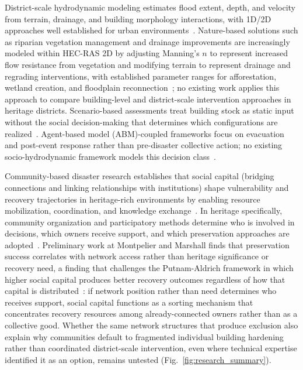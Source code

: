 \documentclass[11pt]{article}
\begin{document}
District-scale hydrodynamic modeling estimates flood extent, depth, and velocity
from terrain, drainage, and building morphology interactions, with 1D/2D approaches
well established for urban
environments~\cite{usgs_effects,sanders2015hydrodynamic,fan2017coupled,leandro2009comparison,mustafa2023gis}.
Nature-based solutions such as riparian vegetation management and drainage
improvements are increasingly modeled within HEC-RAS 2D by adjusting Manning's
$n$ to represent increased flow resistance from vegetation and modifying terrain
to represent drainage and regrading interventions, with established parameter
ranges for afforestation, wetland creation, and floodplain
reconnection~\cite{wang2019evaluating,modellingnbs2026}; no existing work applies
this approach to compare building-level and district-scale intervention approaches
in heritage districts.
Scenario-based assessments treat building stock as static input without the social
decision-making that determines which configurations are
realized~\cite{zhu2019modeling,bsi128,sanders2015hydrodynamic}.
Agent-based model (ABM)-coupled frameworks focus on evacuation and post-event
response rather than pre-disaster collective action; no existing socio-hydrodynamic
framework models this decision class~\cite{aerts2020abm,anshuka2022abm}.

Community-based disaster research establishes that social capital (bridging connections and linking relationships with institutions)
shape vulnerability and recovery trajectories in heritage-rich environments by enabling resource
mobilization, coordination, and knowledge
exchange~\cite{aldrich2015social,MurzynKupisz2013,imperiale2016experiencing}.
In heritage specifically, community organization and participatory methods
determine who is involved in decisions, which owners receive support, and which
preservation approaches are
adopted~\cite{castro2021community,gibson2019engagement,joshi2021community,Jigyasu2024}.
Preliminary work at Montpelier and Marshall finds that preservation success correlates
with network access rather than heritage significance or recovery need, a finding
that challenges the Putnam-Aldrich framework in which higher social capital
produces better recovery outcomes regardless of how that capital is
distributed~\cite{aldrich2015social,putnam2015bowling}: if network position
rather than need determines who receives support, social capital
functions as a sorting mechanism that concentrates recovery resources among
already-connected owners rather than as a collective good.
Whether the same network structures that produce exclusion also explain why
communities default to fragmented individual building hardening rather than
coordinated district-scale intervention, even where technical expertise identified
it as an option, remains untested (Fig.~\ref{fig:research_summary}).
\vspace{-0.3cm}
\end{document}
